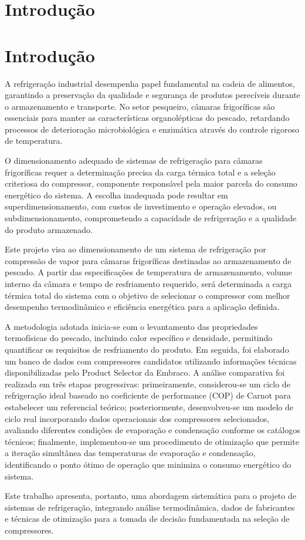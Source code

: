 
\chapter{Introdução}

\chapter{Introdução}

A refrigeração industrial desempenha papel fundamental na cadeia de alimentos, garantindo a preservação da qualidade e segurança de produtos perecíveis durante o armazenamento e transporte. No setor pesqueiro, câmaras frigoríficas são essenciais para manter as características organolépticas do pescado, retardando processos de deterioração microbiológica e enzimática através do controle rigoroso de temperatura.

O dimensionamento adequado de sistemas de refrigeração para câmaras frigoríficas requer a determinação precisa da carga térmica total e a seleção criteriosa do compressor, componente responsável pela maior parcela do consumo energético do sistema. A escolha inadequada pode resultar em superdimensionamento, com custos de investimento e operação elevados, ou subdimensionamento, comprometendo a capacidade de refrigeração e a qualidade do produto armazenado.

Este projeto visa ao dimensionamento de um sistema de refrigeração por compressão de vapor para câmaras frigoríficas destinadas ao armazenamento de pescado. A partir das especificações de temperatura de armazenamento, volume interno da câmara e tempo de resfriamento requerido, será determinada a carga térmica total do sistema com o objetivo de selecionar o compressor com melhor desempenho termodinâmico e eficiência energética para a aplicação definida.

A metodologia adotada inicia-se com o levantamento das propriedades termofísicas do pescado, incluindo calor específico e densidade, permitindo quantificar os requisitos de resfriamento do produto. Em seguida, foi elaborado um banco de dados com compressores candidatos utilizando informações técnicas disponibilizadas pelo Product Selector da Embraco. A análise comparativa foi realizada em três etapas progressivas: primeiramente, considerou-se um ciclo de refrigeração ideal baseado no coeficiente de performance (COP) de Carnot para estabelecer um referencial teórico; posteriormente, desenvolveu-se um modelo de ciclo real incorporando dados operacionais dos compressores selecionados, avaliando diferentes condições de evaporação e condensação conforme os catálogos técnicos; finalmente, implementou-se um procedimento de otimização que permite a iteração simultânea das temperaturas de evaporação e condensação, identificando o ponto ótimo de operação que minimiza o consumo energético do sistema.

Este trabalho apresenta, portanto, uma abordagem sistemática para o projeto de sistemas de refrigeração, integrando análise termodinâmica, dados de fabricantes e técnicas de otimização para a tomada de decisão fundamentada na seleção de compressores.